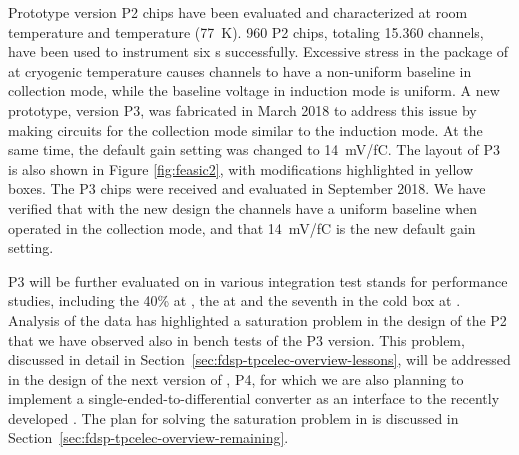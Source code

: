 Prototype version P2  chips have been evaluated and 
characterized at room temperature and \lntwo temperature (\SI{77}{K}). 
\num{960} P2 chips, totaling \num{15,360} channels, 
have been used to instrument six  s successfully. 
Excessive stress in the package of  at cryogenic 
temperature causes  channels to have a non-uniform baseline in 
collection mode, while the baseline  voltage in induction mode 
is uniform. A new prototype, version P3, was fabricated in March 2018 
to address this issue by making  circuits for the collection mode 
similar to the induction mode. At the same time, the default gain
setting was changed to \SI{14}{mV/fC}. The layout of P3
 is also shown in Figure \ref{fig:feasic2}, with modifications 
highlighted in yellow boxes. The P3  chips were 
received and evaluated in September 2018. We have verified that with
the new design the  channels have a uniform baseline when
operated in the collection mode, and that \SI{14}{mV/fC} is the new 
default gain setting.

P3  will be further evaluated on  
in various integration test stands for performance studies, including 
the \num{40}\%  at , the   
at  and the seventh   
in the cold box at . Analysis of the  data
has highlighted a saturation problem in the design of the P2 
that we have observed also in bench tests of the P3 version. This problem,
discussed in detail in Section~\ref{sec:fdsp-tpcelec-overview-lessons},
will be addressed in the design of the next version of , P4,
for which we are also planning to implement a single-ended-to-differential
converter as an interface to the recently developed .
The plan for solving the saturation problem in  is discussed 
in Section~\ref{sec:fdsp-tpcelec-overview-remaining}.

\subsubsection{ }
\label{sec:fdsp-tpcelec-design-femb-adc}

